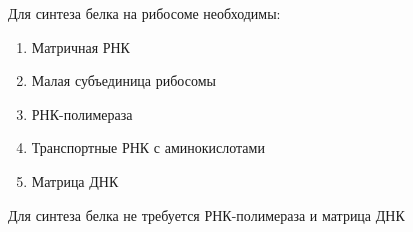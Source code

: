 
Для синтеза белка на рибосоме необходимы:

\begin{enumerate}
    \item Матричная РНК
    \item Малая субъединица рибосомы
    \item РНК-полимераза
    \item Транспортные РНК с аминокислотами
    \item Матрица ДНК
\end{enumerate}

\explanationSection

Для синтеза белка не требуется РНК-полимераза и матрица ДНК

